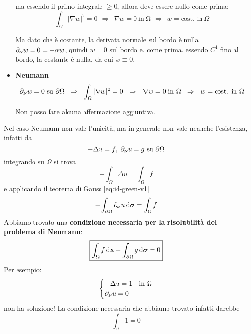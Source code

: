\begin{dimostrazione}
\begin{itemize}
              ma essendo il primo integrale $\displaystyle \geqslant 0$, allora deve essere nullo come prima:
              \begin{equation*}
                  \int _{\Omega }| \nabla w| ^{2} =0\ \ \Rightarrow \ \ \nabla w=0\ \text{in} \ \mathrm{\Omega } \ \ \Rightarrow \ \ w=\text{cost. in} \ \Omega
              \end{equation*}

              Ma dato che è costante, la derivata normale sul bordo è nulla $\displaystyle \partial_{\bm{\nu}} w=0=-\alpha w$, quindi $w=0$ sul bordo e, come prima, essendo $\displaystyle C^{1}$ fino al bordo, la costante è nulla, da cui $\displaystyle w\equiv 0$.
        \item \textbf{Neumann}
              \begin{equation*}
                  \partial_{\nuu} w=0\ \text{su} \ \partial \Omega \ \ \Rightarrow \ \ \int _{\Omega }| \nabla w| ^{2} =0\ \ \Rightarrow \ \ \nabla w=0\ \text{in} \ \mathrm{\Omega } \ \ \Rightarrow \ \ w=\text{cost. in} \ \Omega
              \end{equation*}

              Non posso fare alcuna affermazione aggiuntiva.
    \end{itemize}
\end{dimostrazione}
Nel caso Neumann non vale l'unicità, ma in generale non vale neanche l'esistenza, infatti da
\begin{equation*}
    -\Delta u=f,\ \partial _{\nuu} u=g\ \text{su} \ \partial \Omega
\end{equation*}
integrando su $\displaystyle \Omega $ si trova
\begin{equation*}
    -\int _{\Omega } \Delta u=\int _{\Omega } f
\end{equation*}
e applicando il teorema di Gauss \eqref{eq:id-green-v1}
\begin{equation*}
    -\int _{\partial \Omega } \partial_{\bm{\nu}} u\,\mathrm d \bm{\sigma} =\int _{\Omega } f
\end{equation*}
Abbiamo trovato una \textbf{condizione necessaria per la risolubilità del problema di Neumann}:
\begin{equation}
    \boxed{\int _{\Omega } f\,\mathrm d \mathbf{x}+\int _{\partial \Omega } g\,\mathrm d \bm{\sigma} =0}
\end{equation}
Per esempio:
\begin{equation*}
    \begin{cases}
        -\Delta u=1          & \text{in} \ \Omega \\
        \partial _{\bm{\nu}} u=0 &
    \end{cases}
\end{equation*}
non ha soluzione! La condizione necessaria che abbiamo trovato infatti darebbe
\begin{equation*}
    \int _{\Omega } 1=0
\end{equation*}
